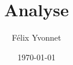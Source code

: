\documentclass[a4paper,twoside]{article}
\title{Analyse}
\author{Félix Yvonnet}
\date{\today}
\begin{document}
\renewcommand{\labelitemi}{\textbullet}
\renewcommand{\labelitemii}{$\circ$}


\maketitle

\tableofcontents
\newpage

% 
% 
% 

% 
\end{document}
